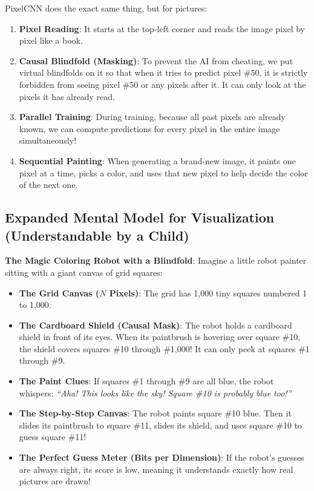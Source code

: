 \documentclass[11pt,a4paper]{article}
\theoremstyle{definition}
\begin{document}
PixelCNN does the exact same thing, but for pictures:
\begin{enumerate}
    \item \textbf{Pixel Reading}: It starts at the top-left corner and reads the image pixel by pixel like a book.
    \item \textbf{Causal Blindfold (Masking)}: To prevent the AI from cheating, we put virtual blindfolds on it so that when it tries to predict pixel \#50, it is strictly forbidden from seeing pixel \#50 or any pixels after it. It can only look at the pixels it has already read.
    \item \textbf{Parallel Training}: During training, because all past pixels are already known, we can compute predictions for every pixel in the entire image simultaneously!
    \item \textbf{Sequential Painting}: When generating a brand-new image, it paints one pixel at a time, picks a color, and uses that new pixel to help decide the color of the next one.
\end{enumerate}

\subsection{Expanded Mental Model for Visualization (Understandable by a Child)}
\textbf{The Magic Coloring Robot with a Blindfold}:
Imagine a little robot painter sitting with a giant canvas of grid squares:
\begin{itemize}
    \item \textbf{The Grid Canvas ($N$ Pixels)}:
    The grid has 1,000 tiny squares numbered 1 to 1,000.
    
    \item \textbf{The Cardboard Shield (Causal Mask)}:
    The robot holds a cardboard shield in front of its eyes. When its paintbrush is hovering over square \#10, the shield covers squares \#10 through \#1,000! It can only peek at squares \#1 through \#9.
    
    \item \textbf{The Paint Clues}:
    If squares \#1 through \#9 are all blue, the robot whispers: \emph{``Aha! This looks like the sky! Square \#10 is probably blue too!''}
    
    \item \textbf{The Step-by-Step Canvas}:
    The robot paints square \#10 blue. Then it slides its paintbrush to square \#11, slides its shield, and uses square \#10 to guess square \#11!
    
    \item \textbf{The Perfect Guess Meter (Bits per Dimension)}:
    If the robot's guesses are always right, its score is low, meaning it understands exactly how real pictures are drawn!
\end{itemize}
\end{document}
